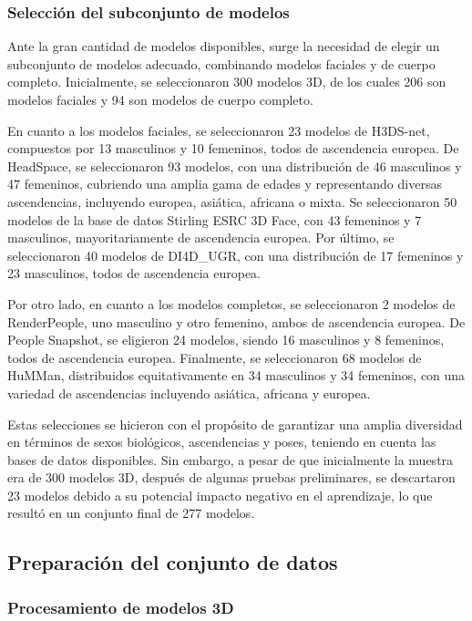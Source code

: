 \subsubsection{Selección del subconjunto de modelos}

Ante la gran cantidad de modelos disponibles, surge la necesidad de elegir un subconjunto de modelos adecuado, combinando modelos faciales y de cuerpo completo.
Inicialmente, se seleccionaron 300 modelos 3D, de los cuales 206 son modelos faciales y 94 son modelos de cuerpo completo.

En cuanto a los modelos faciales, se seleccionaron 23 modelos de H3DS-net, compuestos por 13 masculinos y 10 femeninos, todos de ascendencia europea. De HeadSpace, se seleccionaron 93 modelos, con una distribución de 46 masculinos y 47 femeninos, cubriendo una amplia gama de edades y representando diversas ascendencias, incluyendo europea, asiática, africana o mixta. Se seleccionaron 50 modelos de la base de datos Stirling ESRC 3D Face, con 43 femeninos y 7 masculinos, mayoritariamente de ascendencia europea. Por último, se seleccionaron 40 modelos de DI4D\_UGR, con una distribución de 17 femeninos y 23 masculinos, todos de ascendencia europea.

Por otro lado, en cuanto a los modelos completos, se seleccionaron 2 modelos de RenderPeople, uno masculino y otro femenino, ambos de ascendencia europea. De People Snapshot, se eligieron 24 modelos, siendo 16 masculinos y 8 femeninos, todos de ascendencia europea. Finalmente, se seleccionaron 68 modelos de HuMMan, distribuidos equitativamente en 34 masculinos y 34 femeninos, con una variedad de ascendencias incluyendo asiática, africana y europea.

Estas selecciones se hicieron con el propósito de garantizar una amplia diversidad en términos de sexos biológicos, ascendencias y poses, teniendo en cuenta las bases de datos disponibles. Sin embargo, a pesar de que inicialmente la muestra era de 300 modelos 3D, después de algunas pruebas preliminares, se descartaron 23 modelos debido a su potencial impacto negativo en el aprendizaje, lo que resultó en un conjunto final de 277 modelos.

\subsection{Preparación del conjunto de datos}\label{gen-img}

\subsubsection{Procesamiento de modelos 3D}

